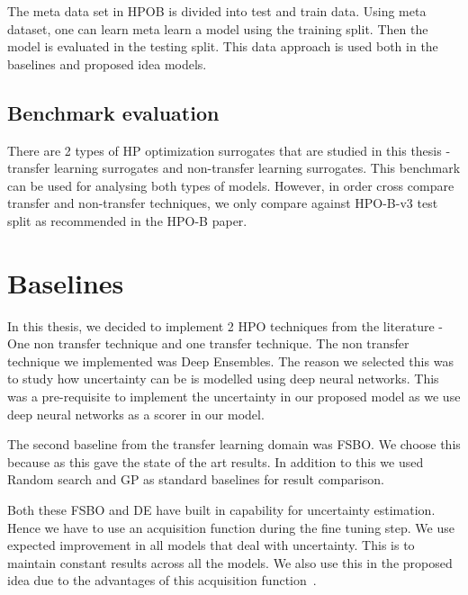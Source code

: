 \documentclass[11pt]{report}
\begin{document}
The meta data set in HPOB is divided into test and train data.
Using meta dataset,  one can learn meta learn a model using the training split.
Then the model is evaluated in the testing split.
This data approach is used both in the baselines and proposed idea models.

\subsection{Benchmark evaluation}
There are 2 types of HP optimization surrogates that are studied in this thesis - transfer learning surrogates
and non-transfer learning surrogates.
This benchmark can be used for analysing both types of models.
However,  in order cross compare transfer and non-transfer techniques,  we only compare against HPO-B-v3 test split as recommended in the HPO-B paper.

\section{Baselines}

In this thesis,  we decided to implement 2 HPO techniques from the literature - One non transfer technique and one transfer technique.
The non transfer technique we implemented was Deep Ensembles.
The reason we selected this was to study how uncertainty can be is modelled using deep neural networks.
This was a pre-requisite to implement the uncertainty in our proposed model as we use deep neural networks as a scorer in our model. 

The second baseline from the transfer learning domain was FSBO.
We choose this because as this gave the state of the art results.
In addition to this we used Random search and GP as standard baselines for result comparison.

Both these FSBO and DE have built in capability for uncertainty estimation.
Hence we have to use an acquisition function during the fine tuning step.
We use expected improvement in all models that deal with uncertainty.
This is to maintain constant results across all the models.
We also use this in the proposed idea due to the advantages of this acquisition function~\cite{Jones1998}.
\end{document}
